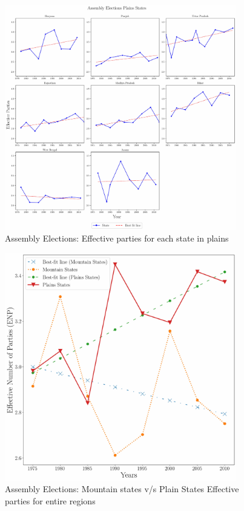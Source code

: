 \begin{figure}[htbp]
    \centering
    \includegraphics[width=0.9\textwidth]{figures/assembly/assembly_elections_plains_states.pdf}
    \caption{Assembly Elections:  Effective parties for each state in plains}
    \label{img:assembly_plain_enp}
\end{figure}

\begin{figure}[htbp]
    \centering
    \includegraphics[width=0.9\textwidth]{figures/assembly/assembly_final_adjusted.pdf}
    \caption{Assembly Elections:  Mountain states v/s Plain States Effective parties for entire regions}
    \label{img:assembly_overall_enp}
\end{figure}


